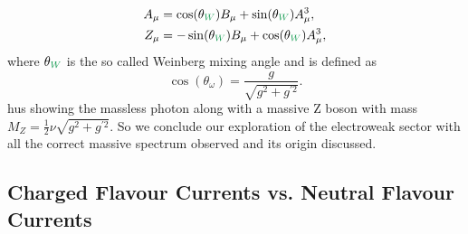 %
\begin{align}
A_\mu &=\cos(\theta_{\Joaoadd{W}}) B_\mu + \sin(\theta_{\Joaoadd{W}}) A_\mu^3,  \\  
Z_\mu & =- \sin(\theta_{\Joaoadd{W}}) B_\mu + \cos(\theta_{\Joaoadd{W}}) A_\mu^3, 
\end{align}
%
where $\theta_{\Joaoadd{W}}$ is the so called Weinberg mixing angle and is defined as
%
\begin{equation}
\cos(\theta_\omega)=\frac{g}{ \sqrt{g^2 + g^{\prime 2}}}.  
\end{equation}
%
hus  showing the massless photon along with a massive Z boson with mass $M_Z= \frac{1}{2} \nu \sqrt{g^2 + g^{\prime 2}} $. 
%
So we conclude our exploration of the electroweak sector with all the correct massive spectrum observed and its origin discussed.

 

\subsection{Charged Flavour Currents vs. Neutral Flavour Currents}

